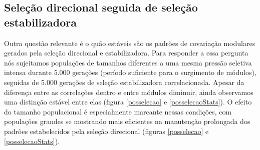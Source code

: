 \subsection{Seleção direcional seguida de seleção estabilizadora}

Outra questão relevante é o quão estáveis são os padrões de covariação
modulares gerados pela seleção direcional e estabilizadora.
Para responder a essa pergunta nós sujeitamos populações de tamanhos
diferentes a uma mesma pressão seletiva intensa durante 5.000 gerações
(período suficiente para o surgimento de módulos), seguidas de 5.000
gerações de seleção estabilizadora correlacionada.
Apesar da diferença entre as correlações dentro e entre módulos
diminuir, ainda observamos uma distinção estável entre elas (figura
\ref{posselecao} e \ref{posselecaoStats}).
O efeito do tamanho populacional é especialmente marcante nessas
condições, com populações grandes se mostrando mais eficientes na
manutenção prolongada dos padrões estabelecidos pela seleção direcional
(figuras \ref{posselecao} e \ref{posselecaoStats}).

